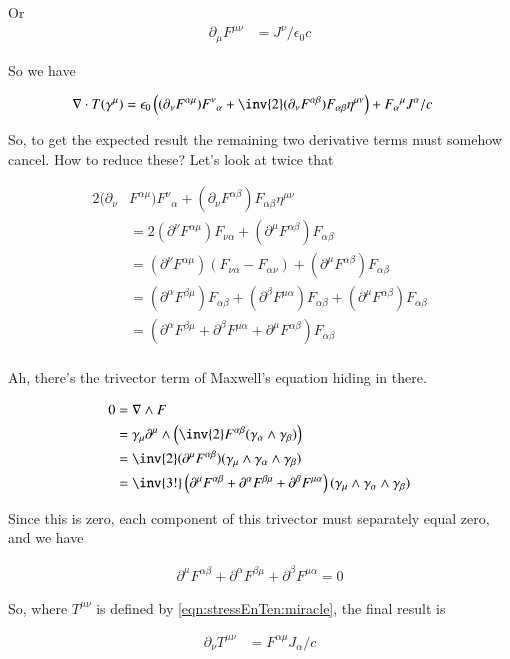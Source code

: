 Or
\begin{align}
\partial_\mu F^{\mu\nu} &= J^\nu/\epsilon_0 c
\end{align}

So we have

\begin{align*}
\grad \cdot T(\gamma^\mu) 
&= \epsilon_0\left(
(\partial_\nu F^{\alpha\mu}) {F^{\nu}}_{\alpha} + 
\inv{2} (\partial_\nu F^{\alpha\beta}) F_{\alpha\beta} \eta^{\mu\nu} 
\right)
+
{F_{\alpha}}^{\mu} J^\alpha/c
\end{align*}

So, to get the expected result the remaining two derivative terms must somehow cancel.  How to reduce these?  Let's look at twice that

\begin{align*}
2 (\partial_\nu &F^{\alpha\mu}) {F^{\nu}}_{\alpha} + (\partial_\nu F^{\alpha\beta}) F_{\alpha\beta} \eta^{\mu\nu} \\
&= 2 (\partial^\nu F^{\alpha\mu}) F_{\nu\alpha} + (\partial^\mu F^{\alpha\beta}) F_{\alpha\beta} \\
&= (\partial^\nu F^{\alpha\mu}) (F_{\nu\alpha} -F_{\alpha\nu}) + (\partial^\mu F^{\alpha\beta}) F_{\alpha\beta} \\
&= 
(\partial^\alpha F^{\beta\mu}) F_{\alpha\beta} 
+(\partial^\beta F^{\mu\alpha}) F_{\alpha\beta}
+ (\partial^\mu F^{\alpha\beta}) F_{\alpha\beta} \\
&= 
(\partial^\alpha F^{\beta\mu} +\partial^\beta F^{\mu\alpha} + \partial^\mu F^{\alpha\beta}) F_{\alpha\beta} \\
\end{align*}

Ah, there's the trivector term of Maxwell's equation hiding in there.

\begin{align*}
0
&= \grad \wedge F \\
&= \gamma_\mu \partial^\mu \wedge \left(\inv{2} F^{\alpha\beta} (\gamma_\alpha \wedge \gamma_\beta) \right) \\
&= \inv{2} (\partial^\mu F^{\alpha\beta}) (\gamma_\mu \wedge \gamma_\alpha \wedge \gamma_\beta) \\
&= \inv{3!} 
\left(
\partial^\mu F^{\alpha\beta}
+\partial^\alpha F^{\beta\mu} 
+\partial^\beta F^{\mu\alpha}
\right)
(\gamma_\mu \wedge \gamma_\alpha \wedge \gamma_\beta)
\end{align*}

Since this is zero, each component of this trivector must separately equal zero, and we have

\begin{align}
\partial^\mu F^{\alpha\beta} +\partial^\alpha F^{\beta\mu} +\partial^\beta F^{\mu\alpha} = 0
\end{align}

So, where $T^{\mu\nu}$ is defined by \ref{eqn:stressEnTen:miracle}, the final result is

\begin{align}\label{eqn:stressEnTen:covariantTensor}
\partial_\nu T^{\mu\nu} &= F^{\alpha\mu} J_\alpha/c
\end{align}
